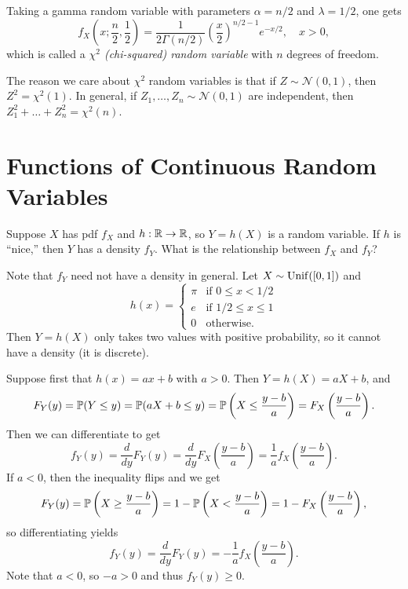 \begin{definition}
  Taking a gamma random variable with parameters
  $\alpha = n / 2$ and $\lambda = 1 / 2$, one gets
  \[
    f_X\left(x; \frac{n}{2}, \frac{1}{2}\right)
    = \frac{1}{2\Gamma(n / 2)} \left(\frac{x}{2}\right)^{n / 2 - 1} e^{-x / 2}, \quad x > 0,
  \]
  which is called a \emph{$\chi^2$ (chi-squared) random variable} with $n$ degrees of freedom.
\end{definition}

\begin{remark}
  The reason we care about $\chi^2$ random variables
  is that
  if $Z \sim \mathcal{N}(0, 1)$, then
  $Z^2 = \chi^2(1)$. In general, if
  $Z_1, \dots, Z_n \sim \mathcal{N}(0, 1)$ are
  independent, then $Z_1^2 + \dots + Z_n^2 = \chi^2(n)$.
\end{remark}

\section{Functions of Continuous Random Variables}
\begin{remark}
Suppose $X$ has pdf $f_X$ and $h : \mathbb{R} \to \mathbb{R}$, so
$Y = h(X)$ is a random variable. If $h$ is ``nice,''
then $Y$ has a density $f_Y$. What is the relationship
between $f_X$ and $f_Y$?
\end{remark}

\begin{remark}
  Note that $f_Y$ need not have a density in general.
  Let $X \sim \operatorname{Unif}([0, 1])$ and
  \[
  h(x) =
  \begin{cases}
    \pi & \text{if $0 \le x < 1 / 2$} \\
    e & \text{if $1 / 2 \le x \le 1$} \\
    0 & \text{otherwise}.
  \end{cases}
  \]
  Then $Y = h(X)$ only takes two values with
  positive probability, so it
  cannot have a density (it is discrete).
\end{remark}

\begin{example}
  Suppose first that $h(x) = ax + b$ with
  $a > 0$. Then $Y = h(X) = aX + b$, and
  \[
    F_Y(y) = \mathbb{P}(Y \le y)
    = \mathbb{P}(aX + b \le y)
    = \mathbb{P}\left(X \le \frac{y - b}{a}\right)
    = F_X\left(\frac{y - b}{a}\right).
  \]
  Then we can differentiate to get
  \[
    f_Y(y) = \frac{d}{dy} F_Y(y)
    = \frac{d}{dy} F_X\left(\frac{y - b}{a}\right)
    = \frac{1}{a} f_X\left(\frac{y - b}{a}\right).
  \]
  If $a < 0$, then the inequality flips and we get
  \[
    F_Y(y) = \mathbb{P}\left(X \ge \frac{y - b}{a}\right)
    = 1 - \mathbb{P}\left(X < \frac{y - b}{a}\right)
    = 1 - F_X\left(\frac{y - b}{a}\right),
  \]
  so differentiating yields
  \[
    f_Y(y) = \frac{d}{dy} F_Y(y)
    = -\frac{1}{a} f_X\left(\frac{y - b}{a}\right).
  \]
  Note that $a < 0$, so $-a > 0$ and thus $f_Y(y) \ge 0$.
\end{example}

